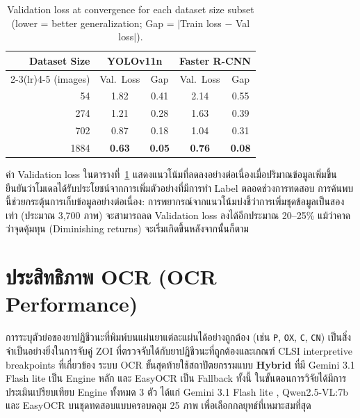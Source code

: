 \begin{table}[H]
  \centering
  \caption{Validation loss at convergence for each dataset size subset (lower = better generalization; Gap = $|$Train loss $-$ Val loss$|$).}
  \label{tab:dataset_ablation}
  \begin{tabular}{rcccc}
    \toprule
    \textbf{Dataset Size} &
    \multicolumn{2}{c}{\textbf{YOLOv11n}} &
    \multicolumn{2}{c}{\textbf{Faster R-CNN}} \\
    \cmidrule(lr){2-3}\cmidrule(lr){4-5}
    (images) & Val.\ Loss & Gap & Val.\ Loss & Gap \\
    \midrule
    54   & 1.82 & 0.41 & 2.14 & 0.55 \\
    274  & 1.21 & 0.28 & 1.63 & 0.39 \\
    702  & 0.87 & 0.18 & 1.04 & 0.31 \\
    1884 & \textbf{0.63} & \textbf{0.05} & \textbf{0.76} & \textbf{0.08} \\
    \bottomrule
  \end{tabular}
\end{table}

ค่า Validation loss ในตารางที่~\ref{tab:dataset_ablation} แสดงแนวโน้มที่ลดลงอย่างต่อเนื่องเมื่อปริมาณข้อมูลเพิ่มขึ้น
ยืนยันว่าโมเดลได้รับประโยชน์จากการเพิ่มตัวอย่างที่มีการทำ Label ตลอดช่วงการทดสอบ
การค้นพบนี้ช่วยกระตุ้นการเก็บข้อมูลอย่างต่อเนื่อง: การพยากรณ์จากแนวโน้มบ่งชี้ว่าการเพิ่มชุดข้อมูลเป็นสองเท่า (ประมาณ 3,700 ภาพ) จะสามารถลด Validation loss ลงได้อีกประมาณ 20--25\% แม้ว่าคาดว่าจุดคุ้มทุน (Diminishing returns) จะเริ่มเกิดขึ้นหลังจากนั้นก็ตาม


\section{ประสิทธิภาพ OCR (OCR Performance)}
\label{sec:ocr_performance}

การระบุตัวย่อของยาปฏิชีวนะที่พิมพ์บนแผ่นยาแต่ละแผ่นได้อย่างถูกต้อง (เช่น \texttt{P}, \texttt{OX}, \texttt{C}, \texttt{CN}) เป็นสิ่งจำเป็นอย่างยิ่งในการจับคู่ ZOI ที่ตรวจจับได้กับยาปฏิชีวนะที่ถูกต้องและเกณฑ์ CLSI interpretive breakpoints ที่เกี่ยวข้อง \cite{clsi2025}
ระบบ OCR ขั้นสุดท้ายใช้สถาปัตยกรรมแบบ \textbf{Hybrid} ที่มี Gemini 3.1 Flash lite \cite{google2025gemini} เป็น Engine หลัก และ EasyOCR \cite{jaidedai2024easyocr} เป็น Fallback ทั้งนี้ ในขั้นตอนการวิจัยได้มีการประเมินเปรียบเทียบ Engine ทั้งหมด 3 ตัว ได้แก่ Gemini 3.1 Flash lite \cite{google2025gemini}, Qwen2.5-VL:7b \cite{qwen2025vl} และ EasyOCR \cite{jaidedai2024easyocr} บนชุดทดสอบแบบครอบคลุม 25 ภาพ เพื่อเลือกกลยุทธ์ที่เหมาะสมที่สุด

